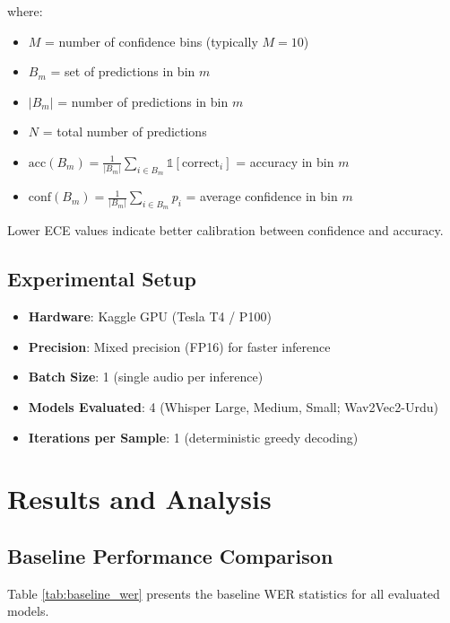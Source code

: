 \noindent where:
\begin{itemize}
    \item $M$ = number of confidence bins (typically $M = 10$)
    \item $B_m$ = set of predictions in bin $m$
    \item $|B_m|$ = number of predictions in bin $m$
    \item $N$ = total number of predictions
    \item $\text{acc}(B_m) = \frac{1}{|B_m|}\sum_{i \in B_m} \mathbb{1}[\text{correct}_i]$ = accuracy in bin $m$
    \item $\text{conf}(B_m) = \frac{1}{|B_m|}\sum_{i \in B_m} p_i$ = average confidence in bin $m$
\end{itemize}

\noindent Lower ECE values indicate better calibration between confidence and accuracy.

\subsection{Experimental Setup}

\begin{itemize}
    \item \textbf{Hardware}: Kaggle GPU (Tesla T4 / P100)
    \item \textbf{Precision}: Mixed precision (FP16) for faster inference
    \item \textbf{Batch Size}: 1 (single audio per inference)
    \item \textbf{Models Evaluated}: 4 (Whisper Large, Medium, Small; Wav2Vec2-Urdu)
    \item \textbf{Iterations per Sample}: 1 (deterministic greedy decoding)
\end{itemize}

\section{Results and Analysis}

\subsection{Baseline Performance Comparison}

Table \ref{tab:baseline_wer} presents the baseline WER statistics for all evaluated models.

